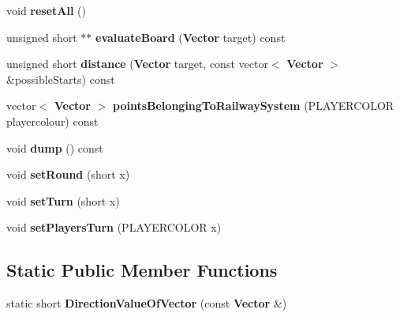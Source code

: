 \begin{DoxyCompactItemize}
\item 
void {\bfseries reset\-All} ()\label{class_state_ae3cf3d6f8fd90d8a59d53ccb1290a46c}

\item 
unsigned short $\ast$$\ast$ {\bfseries evaluate\-Board} ({\bf Vector} target) const \label{class_state_a5bc0dd359e67c72d457a64277afaf621}

\item 
unsigned short {\bfseries distance} ({\bf Vector} target, const vector$<$ {\bf Vector} $>$ \&possible\-Starts) const \label{class_state_a2e17c63ec7373cf144f37933bef1d197}

\item 
vector$<$ {\bf Vector} $>$ {\bfseries points\-Belonging\-To\-Railway\-System} (P\-L\-A\-Y\-E\-R\-C\-O\-L\-O\-R playercolour) const \label{class_state_a8797cce1b552bfb36f01cc8fba0f7e48}

\item 
void {\bfseries dump} () const \label{class_state_a27499f3070aef89461dbec0c99a24225}

\item 
void {\bfseries set\-Round} (short x)\label{class_state_a468eb35199b879f9df58245540ca849c}

\item 
void {\bfseries set\-Turn} (short x)\label{class_state_a5f8cd95cb039eb5333a9fed80b7efd2f}

\item 
void {\bfseries set\-Players\-Turn} (P\-L\-A\-Y\-E\-R\-C\-O\-L\-O\-R x)\label{class_state_a100c1959a9c60fdcd3400a3fda247588}

\end{DoxyCompactItemize}
\subsection*{Static Public Member Functions}
\begin{DoxyCompactItemize}
\item 
static short {\bfseries Direction\-Value\-Of\-Vector} (const {\bf Vector} \&)\label{class_state_a71c49cae9e5978384540e340bda83ef1}

\end{DoxyCompactItemize}
